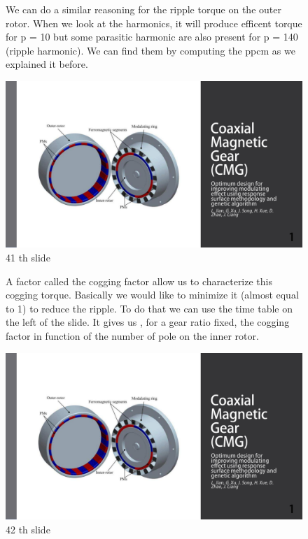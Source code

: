 \begin{figure}[H]
    \begin{minipage}{.45\linewidth}
   We can do a similar reasoning for the ripple torque on the outer rotor.
   When we look at the harmonics, it will produce efficent torque for p = 10 but some parasitic harmonic are also present for p = 140 (ripple harmonic). We can find them by computing the ppcm as we explained it before.

 
       
    \end{minipage}
    \hfill%
    \begin{minipage}[c]{.45\linewidth}
        \centering
        \includegraphics[page={41},width=\textwidth]{LELEC2311.allow.pdf}
        \caption{41 th slide}
    \end{minipage}
\end{figure}

\begin{figure}[H]
    \begin{minipage}{.45\linewidth}
   A factor called the cogging factor allow us to characterize this cogging torque. Basically we would like to minimize it (almost equal to 1) to reduce the ripple. To do that we can use the time table on the left of the slide. It gives us , for a gear ratio fixed, the cogging factor in function of the number of pole on the inner rotor.

 
       
    \end{minipage}
    \hfill%
    \begin{minipage}[c]{.45\linewidth}
        \centering
        \includegraphics[page={42},width=\textwidth]{LELEC2311.allow.pdf}
        \caption{42 th slide}
    \end{minipage}
\end{figure}



